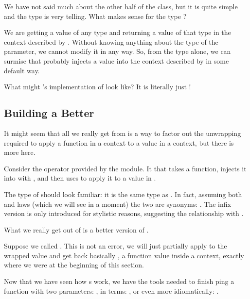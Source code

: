 We have not said much about the other half of the  class, but it is quite simple and the type is very telling.
What makes sense for the type ?

We are getting a value of any type and returning a value of that type in the context described by . Without knowing
anything about the type  of the parameter, we cannot modify it in any way. So, from the type alone, we can surmise that
 probably injects a value into the context described by  in some default way.

What might 's implementation of  look like? It is literally just !

\subsection{Building a Better }

It might seem that all we really get from  is a way to factor out the unwrapping required to apply a function
in a context to a value in a context, but there is more here.

Consider the operator \code{(<\$>)} provided by the  module.
It that takes a function, injects it into  with , and then uses \code{(<*>)} to apply it to a value
in . 



The type of \code{(<\$>)} should look familiar: it is the same type as . In fact, assuming both 
and  laws (which we will see in a moment) the two are synonyms: .
The infix version is only introduced for stylistic reasons, suggesting the relationship with \code{(<*>)}.

What we really get out of  is a better version of .

Suppose we called . This is not an error, we will just partially apply \code{(+)} to the wrapped
value  and get back basically , a function value inside a  context, exactly where 
we were at the beginning of this section.

Now that we have seen how s work, we have the tools needed to finish ping a function 
with two parameters: , in  terms: ,
or even more idiomatically: .

